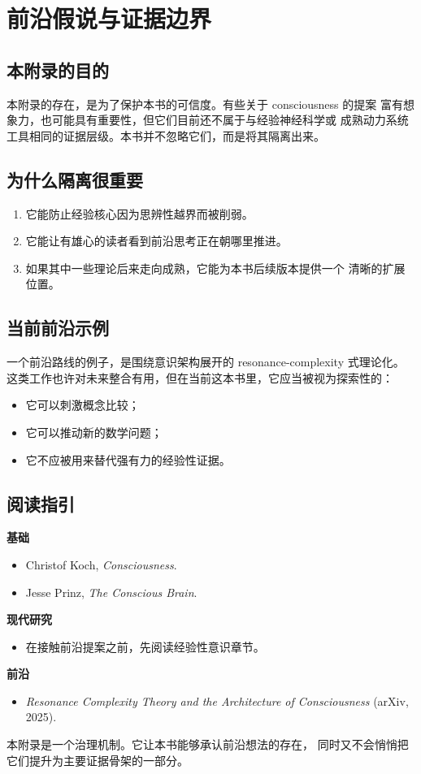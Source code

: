\chapter{前沿假说与证据边界}
\label{app:frontier}

\section{本附录的目的}

本附录的存在，是为了保护本书的可信度。有些关于 consciousness 的提案
富有想象力，也可能具有重要性，但它们目前还不属于与经验神经科学或
成熟动力系统工具相同的证据层级。本书并不忽略它们，而是将其隔离出来。

\section{为什么隔离很重要}

\begin{enumerate}[nosep]
  \item 它能防止经验核心因为思辨性越界而被削弱。
  \item 它能让有雄心的读者看到前沿思考正在朝哪里推进。
  \item 如果其中一些理论后来走向成熟，它能为本书后续版本提供一个
        清晰的扩展位置。
\end{enumerate}

\section{当前前沿示例}

一个前沿路线的例子，是围绕意识架构展开的 resonance-complexity 式理论化。
这类工作也许对未来整合有用，但在当前这本书里，它应当被视为探索性的：
\begin{itemize}[nosep]
  \item 它可以刺激概念比较；
  \item 它可以推动新的数学问题；
  \item 它不应被用来替代强有力的经验性证据。
\end{itemize}

\section{阅读指引}

\begin{readingbox}
\textbf{基础}
\begin{itemize}[nosep]
  \item Christof Koch, \emph{Consciousness}.
  \item Jesse Prinz, \emph{The Conscious Brain}.
\end{itemize}
\textbf{现代研究}
\begin{itemize}[nosep]
  \item 在接触前沿提案之前，先阅读经验性意识章节。
\end{itemize}
\textbf{前沿}
\begin{itemize}[nosep]
  \item \emph{Resonance Complexity Theory and the Architecture of
        Consciousness} (arXiv, 2025).
\end{itemize}
\end{readingbox}

\begin{summarybox}
本附录是一个治理机制。它让本书能够承认前沿想法的存在，
同时又不会悄悄把它们提升为主要证据骨架的一部分。
\end{summarybox}